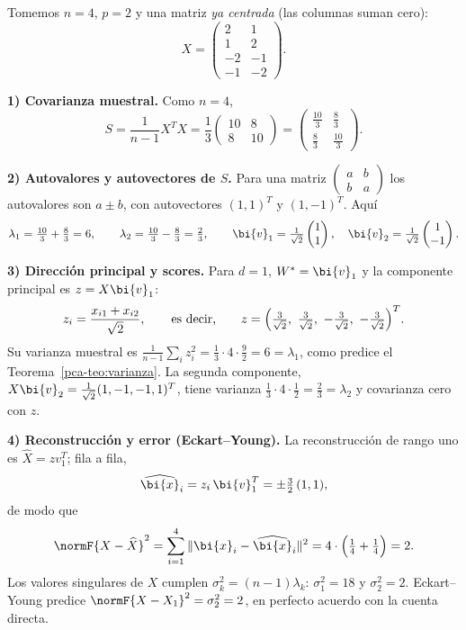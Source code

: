 \begin{example}\label{pca-ej:mano}
Tomemos $n=4$, $p=2$ y una matriz \emph{ya centrada} (las columnas suman cero):
\[
X=\begin{pmatrix}2&1\\1&2\\-2&-1\\-1&-2\end{pmatrix}.
\]

\noindent\textbf{1) Covarianza muestral.} Como $n=4$,
\[
S=\frac{1}{n-1}X^T X=\frac13\begin{pmatrix}10&8\\8&10\end{pmatrix}
=\begin{pmatrix}\tfrac{10}{3}&\tfrac{8}{3}\\[2pt]\tfrac{8}{3}&\tfrac{10}{3}\end{pmatrix}.
\]

\medskip
\noindent\textbf{2) Autovalores y autovectores de $S$.} Para una matriz
$\left(\begin{smallmatrix}a&b\\b&a\end{smallmatrix}\right)$ los autovalores
son $a\pm b$, con autovectores $(1,1)^T$ y $(1,-1)^T$. Aquí
\[
\lambda_1=\tfrac{10}{3}+\tfrac{8}{3}=6,\qquad
\lambda_2=\tfrac{10}{3}-\tfrac{8}{3}=\tfrac23,\qquad
\bi{v}_1=\tfrac1{\sqrt2}\begin{pmatrix}1\\1\end{pmatrix},\quad
\bi{v}_2=\tfrac1{\sqrt2}\begin{pmatrix}1\\-1\end{pmatrix}.
\]

\medskip
\noindent\textbf{3) Dirección principal y scores.} Para $d=1$, $W^\ast=\bi{v}_1$ y
la componente principal es $z=X\bi{v}_1$:
\[
z_i=\frac{x_{i1}+x_{i2}}{\sqrt2},\qquad\text{es decir,}\qquad
z=\Bigl(\tfrac{3}{\sqrt2},\ \tfrac{3}{\sqrt2},\ -\tfrac{3}{\sqrt2},\ -\tfrac{3}{\sqrt2}\Bigr)^T .
\]
Su varianza muestral es
$\frac{1}{n-1}\sum_iz_i^2=\frac13\cdot4\cdot\frac92=6=\lambda_1$, como
predice el Teorema~\ref{pca-teo:varianza}. La segunda componente,
$X\bi{v}_2=\frac{1}{\sqrt2}(1,-1,-1,1)^T$, tiene varianza
$\frac13\cdot4\cdot\frac12=\frac23=\lambda_2$ y covarianza cero con $z$.

\medskip
\noindent\textbf{4) Reconstrucción y error (Eckart--Young).} La reconstrucción
de rango uno es $\widehat X=zv_1^T$; fila a fila,
\[
\widehat{\bi{x}}_i=z_i\,\bi{v}_1^T=\pm\tfrac{3}{2}\,(1,1),
\]
de modo que
\[
\normF{X-\widehat X}^2=\sum_{i=1}^4\|\bi{x}_i-\widehat{\bi{x}}_i\|^2
=4\cdot\Bigl(\tfrac14+\tfrac14\Bigr)=2 .
\]
Los valores singulares de $X$ cumplen $\sigma_k^2=(n-1)\lambda_k$:
$\sigma_1^2=18$ y $\sigma_2^2=2$. Eckart--Young predice
$\normF{X-X_1}^2=\sigma_2^2=2$, en perfecto acuerdo con la cuenta directa.


\end{example}
